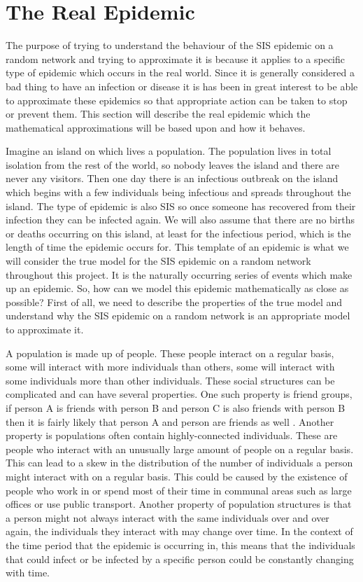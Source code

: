 \documentclass{uonmathsreport}
\begin{document}
\newpage
\section{The Real Epidemic} \label{sec:4}
\indent
The purpose of trying to understand the behaviour of the SIS epidemic on a random network and trying to approximate it is because it applies to a specific type of epidemic which occurs in the real world. Since it is generally considered a bad thing to have an infection or disease it is has been in great interest to be able to approximate these epidemics so that appropriate action can be taken to stop or prevent them. This section will describe the real epidemic which the mathematical approximations will be based upon and how it behaves.

Imagine an island on which lives a population. The population lives in total isolation from the rest of the world, so nobody leaves the island and there are never any visitors. Then one day there is an infectious outbreak on the island which begins with a few individuals being infectious and spreads throughout the island. The type of epidemic is also SIS so once someone has recovered from their infection they can be infected again. We will also assume that there are no births or deaths occurring on this island, at least for the infectious period, which is the length of time the epidemic occurs for. This template of an epidemic is what we will consider the true model for the SIS epidemic on a random network throughout this project. It is the naturally occurring series of events which make up an epidemic. So, how can we model this epidemic mathematically as close as possible? First of all, we need to describe the properties of the true model and understand why the SIS epidemic on a random network is an appropriate model to approximate it. 

A population is made up of people. These people interact on a regular basis, some will interact with more individuals than others, some will interact with some individuals more than other individuals. These social structures can be complicated and can have several properties. One such property is friend groups, if person A is friends with person B and person C is also friends with person B then it is fairly likely that person A and person are friends as well \cite{bibandersson1}. Another property is populations often contain highly-connected individuals. These are people who interact with an unusually large amount of people on a regular basis. This can lead to a skew in the distribution of the number of individuals a person might interact with on a regular basis. This could be caused by the existence of people who work in or spend most of their time in communal areas such as large offices or use public transport. Another property of population structures is that a person might not always interact with the same individuals over and over again, the individuals they interact with may change over time. In the context of the time period that the epidemic is occurring in, this means that the individuals that could infect or be infected by a specific person could be constantly changing with time.
\end{document}
